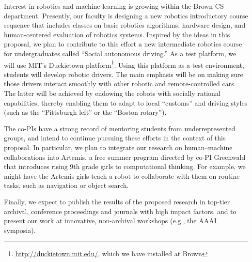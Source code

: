 Interest in robotics and machine learning is growing within the Brown
CS department.  Presently, our faculty is designing a new robotics
introductory course sequence that includes classes on basic robotics
algorithms, hardware design, and human-centered evaluation of robotics
systems.  Inspired by the ideas in this proposal, we plan to
contribute to this effort a new intermediate robotics course for
undergraduates called ``Social autonomous driving.''  As a test
platform, we will use MIT's Duckietown
platform\footnote{\url{http://duckietown.mit.edu/}, which we have installed at Brown}.
Using this platform as a test environment, students will
develop robotic drivers.  The main emphasis will be on making sure
those drivers interact smoothly with other robotic and
remote-controlled cars.  The latter will be achieved by endowing the
robots with socially rational capabilities, thereby enabling them to
adapt to local ``customs'' and driving styles (such as the
``Pittsburgh left'' or the ``Boston rotary'').



The co-PIs have a strong record of mentoring students from
underrepresented groups, and intend to continue pursuing these efforts
in the context of this proposal.  In particular, we plan to integrate
our research on human--machine collaborations into Artemis, a free
summer program directed by co-PI Greenwald that introduces rising 9th
grade girls to computational thinking.  For example, we might have the
Artemis girls teach a robot to collaborate with them on routine tasks,
such as navigation or object search.



Finally, we expect to publish the results of the proposed research in
top-tier archival, conference proceedings and journals with high
impact factors, and to present our work at innovative, non-archival
workshops (e.g., the AAAI symposia).

